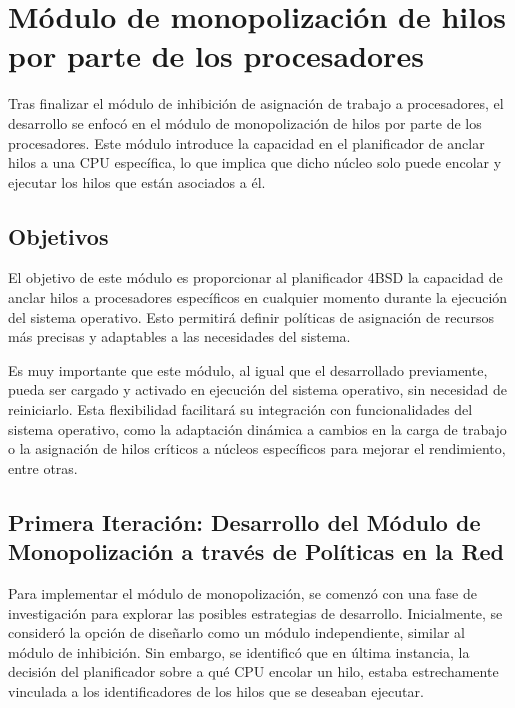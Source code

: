 \section{Módulo de monopolización de hilos por parte de los procesadores}

Tras finalizar el módulo de inhibición de asignación de trabajo a procesadores, el desarrollo se enfocó en el módulo de monopolización de hilos por parte de los procesadores. Este módulo introduce la capacidad en el planificador de anclar hilos a una CPU específica, lo que implica que dicho núcleo solo puede encolar y ejecutar los hilos que están asociados a él.\par

\subsection{Objetivos}

El objetivo de este módulo es proporcionar al planificador 4BSD la capacidad de anclar hilos a procesadores específicos en cualquier momento durante la ejecución del sistema operativo. Esto permitirá definir políticas de asignación de recursos más precisas y adaptables a las necesidades del sistema.\par

Es muy importante que este módulo, al igual que el desarrollado previamente, pueda ser cargado y activado en ejecución del sistema operativo, sin necesidad de reiniciarlo. Esta flexibilidad facilitará su integración con funcionalidades del sistema operativo, como la adaptación dinámica a cambios en la carga de trabajo o la asignación de hilos críticos a núcleos específicos para mejorar el rendimiento, entre otras.\par

\subsection{Primera Iteración: Desarrollo del Módulo de Monopolización a través de Políticas en la Red}

Para implementar el módulo de monopolización, se comenzó con una fase de investigación para explorar las posibles estrategias de desarrollo. Inicialmente, se consideró la opción de diseñarlo como un módulo independiente, similar al módulo de inhibición. Sin embargo, se identificó que en última instancia, la decisión del planificador sobre a qué CPU encolar un hilo, estaba estrechamente vinculada a los identificadores de los hilos que se deseaban ejecutar.\par

